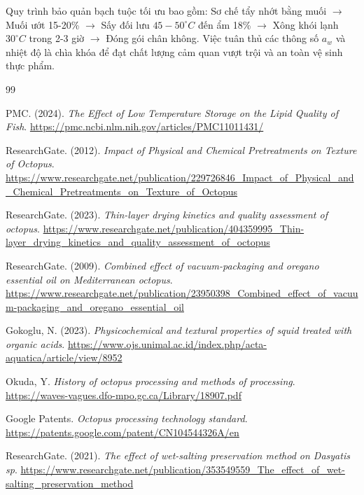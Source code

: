 \documentclass[12pt,a4paper]{report}
\begin{document}
Quy trình bảo quản bạch tuộc tối ưu bao gồm: Sơ chế tẩy nhớt bằng muối $\rightarrow$ Muối ướt 15-20\% $\rightarrow$ Sấy đối lưu $45-50^\circ C$ đến ẩm 18\% $\rightarrow$ Xông khói lạnh $30^\circ C$ trong 2-3 giờ $\rightarrow$ Đóng gói chân không. Việc tuân thủ các thông số $a_w$ và nhiệt độ là chìa khóa để đạt chất lượng cảm quan vượt trội và an toàn vệ sinh thực phẩm.

\newpage
\renewcommand{\bibname}{Tài liệu tham khảo}
\begin{thebibliography}{99}

 PMC. (2024). \textit{The Effect of Low Temperature Storage on the Lipid Quality of Fish}. \url{https://pmc.ncbi.nlm.nih.gov/articles/PMC11011431/}

 ResearchGate. (2012). \textit{Impact of Physical and Chemical Pretreatments on Texture of Octopus}. \url{https://www.researchgate.net/publication/229726846_Impact_of_Physical_and_Chemical_Pretreatments_on_Texture_of_Octopus}

 ResearchGate. (2023). \textit{Thin-layer drying kinetics and quality assessment of octopus}. \url{https://www.researchgate.net/publication/404359995_Thin-layer_drying_kinetics_and_quality_assessment_of_octopus}

 ResearchGate. (2009). \textit{Combined effect of vacuum-packaging and oregano essential oil on Mediterranean octopus}. \url{https://www.researchgate.net/publication/23950398_Combined_effect_of_vacuum-packaging_and_oregano_essential_oil}

 Gokoglu, N. (2023). \textit{Physicochemical and textural properties of squid treated with organic acids}. \url{https://www.ojs.unimal.ac.id/index.php/acta-aquatica/article/view/8952}

 Okuda, Y. \textit{History of octopus processing and methods of processing}. \url{https://waves-vagues.dfo-mpo.gc.ca/Library/18907.pdf}

 Google Patents. \textit{Octopus processing technology standard}. \url{https://patents.google.com/patent/CN104544326A/en}

 ResearchGate. (2021). \textit{The effect of wet-salting preservation method on Dasyatis sp}. \url{https://www.researchgate.net/publication/353549559_The_effect_of_wet-salting_preservation_method}


\end{thebibliography}
\end{document}
